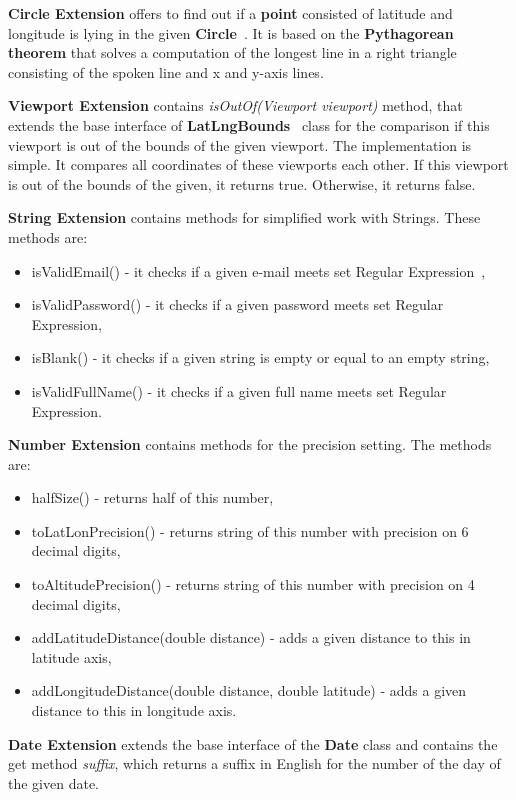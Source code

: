 \textbf{Circle Extension} offers to find out if a \textbf{point} consisted of latitude and longitude is lying in the given \textbf{Circle}~\cite{googleMapsCircles}.
It is based on the \textbf{Pythagorean theorem} that solves a computation of the longest line in a right triangle consisting of the spoken line and x and y-axis lines.

\textbf{Viewport Extension} contains \textit{isOutOf(Viewport viewport)} method, that extends the base interface of \textbf{LatLngBounds}~\cite{latLngBounds} class for the comparison if this viewport is out of the bounds of the given viewport.
The implementation is simple.
It compares all coordinates of these viewports each other.
If this viewport is out of the bounds of the given, it returns true.
Otherwise, it returns false.

\textbf{String Extension} contains methods for simplified work with Strings.
These methods are:
\begin{itemize}
    \item isValidEmail() - it checks if a given e-mail meets set Regular Expression~\cite{regExp},
    \item isValidPassword() - it checks if a given password meets set Regular Expression,
    \item isBlank() - it checks if a given string is empty or equal to an empty string,
    \item isValidFullName() - it checks if a given full name meets set Regular Expression.
\end{itemize}
\textbf{Number Extension} contains methods for the precision setting.
The methods are:
\begin{itemize}
    \item halfSize() - returns half of this number,
    \item toLatLonPrecision() - returns string of this number with precision on 6 decimal digits,
    \item toAltitudePrecision() - returns string of this number with precision on 4 decimal digits,
    \item addLatitudeDistance(double distance) - adds a given distance to this in latitude axis,
    \item addLongitudeDistance(double distance, double latitude) - adds a given distance to this in longitude axis.
\end{itemize}

\textbf{Date Extension} extends the base interface of the \textbf{Date} class and contains the get method \textit{suffix}, which returns a suffix in English for the number of the day of the given date.

